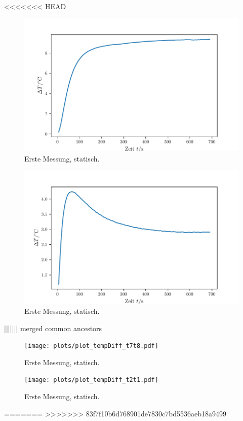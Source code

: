 <<<<<<< HEAD
\begin{figure}
    \centering
    \includegraphics[max width=\linewidth]{plots/plot_tempDiff_steel.pdf}
    \caption{Erste Messung, statisch.}
    \label{fig:plot_tempDiff_t7t8}
\end{figure}

\begin{figure}
    \centering
    \includegraphics[max width=\linewidth]{plots/plot_tempDiff_brass_wide.pdf}
    \caption{Erste Messung, statisch.}
    \label{fig:plot_tempDiff_t2t1}
\end{figure}

||||||| merged common ancestors
\begin{figure}
    \centering
    \texttt{[image: plots/plot\_tempDiff\_t7t8.pdf]}
    \caption{Erste Messung, statisch.}
    \label{fig:plot_tempDiff_t7t8}
\end{figure}

\begin{figure}
    \centering
    \texttt{[image: plots/plot\_tempDiff\_t2t1.pdf]}
    \caption{Erste Messung, statisch.}
    \label{fig:plot_tempDiff_t2t1}
\end{figure}

=======
>>>>>>> 83f7f10b6d768901de7830c7bd5536aeb18a9499


